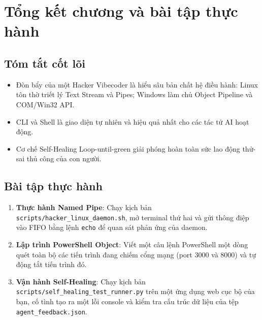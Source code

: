 \documentclass[a4paper,11pt]{article}
\begin{document}
\section{Tổng kết chương và bài tập thực hành}

\subsection{Tóm tắt cốt lõi}
\begin{itemize}[leftmargin=1.5em]
    \item Đòn bẩy của một Hacker Vibecoder là hiểu sâu bản chất hệ điều hành: Linux tôn thờ triết lý Text Stream và Pipes; Windows làm chủ Object Pipeline và COM/Win32 API.
    \item CLI và Shell là giao diện tự nhiên và hiệu quả nhất cho các tác tử AI hoạt động.
    \item Cơ chế Self-Healing Loop-until-green giải phóng hoàn toàn sức lao động thử-sai thủ công của con người.
\end{itemize}

\subsection{Bài tập thực hành}
\begin{enumerate}[label={\arabic*.}]
    \item \textbf{Thực hành Named Pipe}: Chạy kịch bản \texttt{scripts/hacker\_linux\_daemon.sh}, mở terminal thứ hai và gửi thông điệp vào FIFO bằng lệnh \texttt{echo} để quan sát phản ứng của daemon.
    \item \textbf{Lập trình PowerShell Object}: Viết một câu lệnh PowerShell một dòng quét toàn bộ các tiến trình đang chiếm cổng mạng (port 3000 và 8000) và tự động tắt tiến trình đó.
    \item \textbf{Vận hành Self-Healing}: Chạy kịch bản \texttt{scripts/self\_healing\_test\_runner.py} trên một ứng dụng web cục bộ của bạn, cố tình tạo ra một lỗi console và kiểm tra cấu trúc dữ liệu của tệp \texttt{agent\_feedback.json}.
\end{enumerate}
\end{document}
